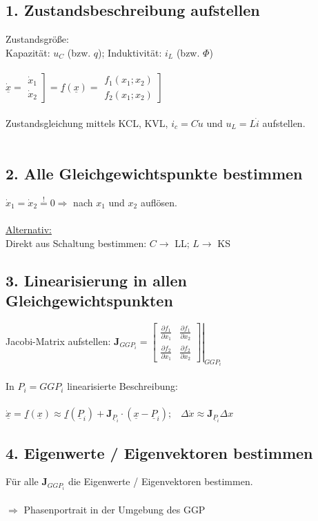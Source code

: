 \documentclass[a4paper,twocolumn,10pt]{article}
\newcommand{\sollsein}{\stackrel{!}{=}}
\begin{document}
\subsection*{1. Zustandsbeschreibung aufstellen}
Zustandsgröße:\\
Kapazität: $u_C$ (bzw. $q$); Induktivität: $i_L$ (bzw. $\Phi$)\\\\
$\dot{\underline{x}}=\left.\begin{matrix}\dot x_1 \\ \dot x_2\end{matrix}\right] =\underline{f}(\underline{x})=\left.\begin{matrix}f_1(x_1;x_2) \\ f_2(x_1;x_2)\end{matrix}\right]$\\\\
Zustandsgleichung mittels KCL, KVL, $i_c=C\dot u$ und $u_L=L\dot i$ aufstellen.\\\\
\subsection*{2. Alle Gleichgewichtspunkte bestimmen}
$\dot x_1 =\dot x_2\sollsein 0\Rightarrow$ nach $x_1$ und $x_2$ auflösen.\\\\
\underline{Alternativ:}\\
Direkt aus Schaltung bestimmen: $C\rightarrow$ LL; $L\rightarrow$ KS
\subsection*{3. Linearisierung in allen Gleichgewichtspunkten}
Jacobi-Matrix aufstellen: $\textbf{J}_{GGP_i}=\left.\begin{bmatrix}\frac{\partial f_1}{\partial x_1} & \frac{\partial f_1}{\partial x_2}\\ \frac{\partial f_2}{\partial x_1} & \frac{\partial f_2}{\partial x_2}\end{bmatrix}\right|_{GGP_i}$\\\\
In $P_i=GGP_i$ linearisierte Beschreibung:\\\\
$\dot{\underline{x}}=\underline{f}(\underline{x})\approx \underline{f}(\underline{P}_i)+\textbf{J}_{\underline{P}_i}\cdot (\underline{x}-\underline{P}_i);\;\;\;\Delta \dot x\approx \textbf{J}_{\underline{P}_i}\Delta x$
\subsection*{4. Eigenwerte / Eigenvektoren bestimmen}
Für alle $\textbf{J}_{GGP_i}$ die Eigenwerte / Eigenvektoren bestimmen.\\\\
$\Rightarrow$ Phasenportrait in der Umgebung des GGP
\end{document}

